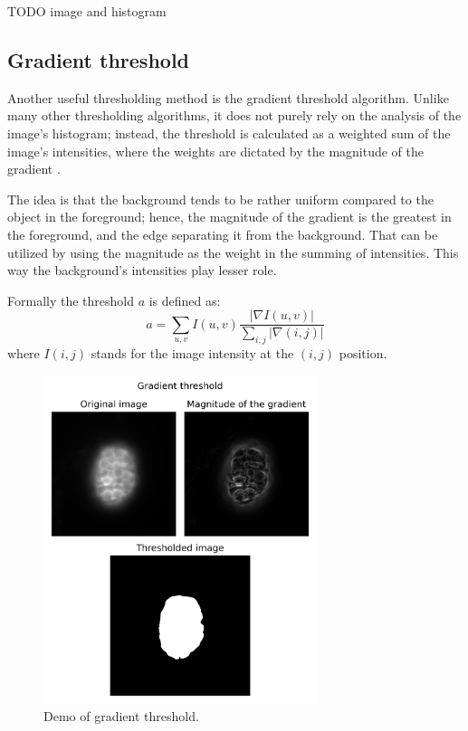 \documentclass[
  digital,     %
  oneside,     %
  nosansbold,  %
  nocolorbold, %
  lof,         %
  lot,         %
]{fithesis4}
\begin{document}
TODO image and histogram

\subsection{Gradient threshold}

Another useful thresholding method is the gradient threshold algorithm. Unlike
many other thresholding algorithms, it does not purely rely on the analysis of
the image's histogram; instead, the threshold is calculated as a weighted sum of
the image's intensities, where the weights are dictated by the magnitude of the
gradient \cite{pb130}.

The idea is that the background tends to be rather uniform compared to the
object in the foreground; hence, the magnitude of the gradient is the greatest
in the foreground, and the edge separating it from the background. That can be
utilized by using the magnitude as the weight in the summing of intensities.
This way the background's intensities play lesser role.

Formally the threshold $a$ is defined as:
$$a = \sum_{u, v} I(u, v) \frac{|\nabla I(u, v)|}{\sum_{i, j} |\nabla(i,j)|}$$
where $I(i, j)$ stands for the image intensity at the $(i, j)$ position.

\begin{figure}
    \begin{center}
        \includegraphics[width=8cm]{"resources/demo-gradient-threshold.png"}
    \end{center}
    \caption{Demo of gradient threshold.}
    \label{fig:demo_grad_thresh}
\end{figure}
\end{document}
